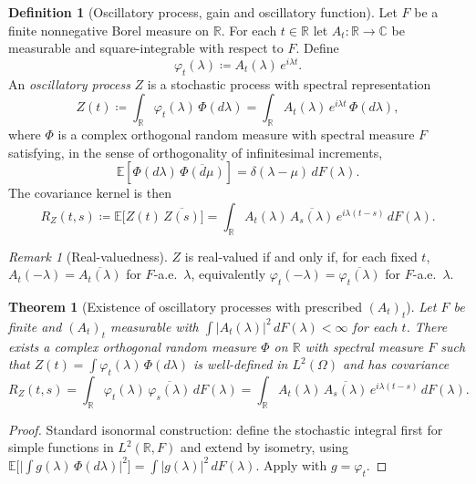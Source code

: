\documentclass[12pt]{article}
\newtheorem{theorem}{Theorem}
\theoremstyle{definition}
\newtheorem{definition}{Definition}
\theoremstyle{remark}
\newtheorem{remark}{Remark}
\begin{document}
\begin{definition}[Oscillatory process, gain and oscillatory function]
Let $F$ be a finite nonnegative Borel measure on $\mathbb{R}$. For each $t\in\mathbb{R}$ let $A_t:\mathbb{R}\to\mathbb{C}$ be measurable and square-integrable with respect to $F$.
Define
\[
\varphi_t(\lambda)\coloneqq A_t(\lambda)\,e^{i\lambda t}.
\]
An \emph{oscillatory process} $Z$ is a stochastic process with spectral representation
\begin{equation}
  Z(t) \coloneqq \int_{\mathbb{R}} \varphi_t(\lambda)\,\Phi(d\lambda)
  = \int_{\mathbb{R}} A_t(\lambda)\,e^{i\lambda t}\,\Phi(d\lambda),
\end{equation}
where $\Phi$ is a complex orthogonal random measure with spectral measure $F$ satisfying, in the sense of orthogonality of infinitesimal increments,
\begin{equation}
  \mathbb{E}\!\left[\Phi(d\lambda)\,\overline{\Phi(d\mu)}\right] = \delta(\lambda-\mu)\,dF(\lambda).
\end{equation}
The covariance kernel is then
\begin{equation}
  R_Z(t,s)\coloneqq \mathbb{E}\big[Z(t)\,\overline{Z(s)}\big]
  = \int_{\mathbb{R}} A_t(\lambda)\,\overline{A_s(\lambda)}\,e^{i\lambda(t-s)}\,dF(\lambda).
\end{equation}
\end{definition}

\begin{remark}[Real-valuedness]
$Z$ is real-valued if and only if, for each fixed $t$, $A_t(-\lambda)=\overline{A_t(\lambda)}$ for $F$-a.e.\ $\lambda$, equivalently $\varphi_t(-\lambda)=\overline{\varphi_t(\lambda)}$ for $F$-a.e.\ $\lambda$.
\end{remark}

\begin{theorem}[Existence of oscillatory processes with prescribed $(A_t)_t$]
Let $F$ be finite and $(A_t)_t$ measurable with $\int |A_t(\lambda)|^2\,dF(\lambda)<\infty$ for each $t$. There exists a complex orthogonal random measure $\Phi$ on $\mathbb{R}$ with spectral measure $F$ such that $Z(t)=\int \varphi_t(\lambda)\,\Phi(d\lambda)$ is well-defined in $L^2(\Omega)$ and has covariance
\[
R_Z(t,s)=\int_{\mathbb{R}} \varphi_t(\lambda)\,\overline{\varphi_s(\lambda)}\,dF(\lambda)
=\int_{\mathbb{R}} A_t(\lambda)\,\overline{A_s(\lambda)}\,e^{i\lambda(t-s)}\,dF(\lambda).
\]
\end{theorem}

\begin{proof}
Standard isonormal construction: define the stochastic integral first for simple functions in $L^2(\mathbb{R},F)$ and extend by isometry, using $\mathbb{E}\big[\big|\int g(\lambda)\,\Phi(d\lambda)\big|^2\big]=\int |g(\lambda)|^2\,dF(\lambda)$. Apply with $g=\varphi_t$.
\end{proof}
\end{document}
